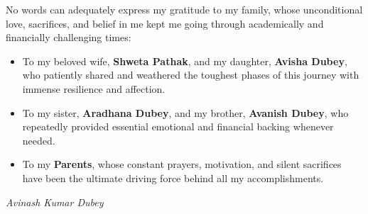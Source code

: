 No words can adequately express my gratitude to my family, whose unconditional love, sacrifices, and belief in me kept me going through academically and financially challenging times:
\begin{itemize}
    \item To my beloved wife, \textbf{Shweta Pathak}, and my daughter, \textbf{Avisha Dubey}, who patiently shared and weathered the toughest phases of this journey with immense resilience and affection.
    \item To my sister, \textbf{Aradhana Dubey}, and my brother, \textbf{Avanish Dubey}, who repeatedly provided essential emotional and financial backing whenever needed.
    \item To my \textbf{Parents}, whose constant prayers, motivation, and silent sacrifices have been the ultimate driving force behind all my accomplishments.
\end{itemize}
\vspace{1.5em}
\begin{flushright}
\textit{Avinash Kumar Dubey}
\end{flushright}
\makeapproval
\begin{coursecertificate}
\end{coursecertificate}
